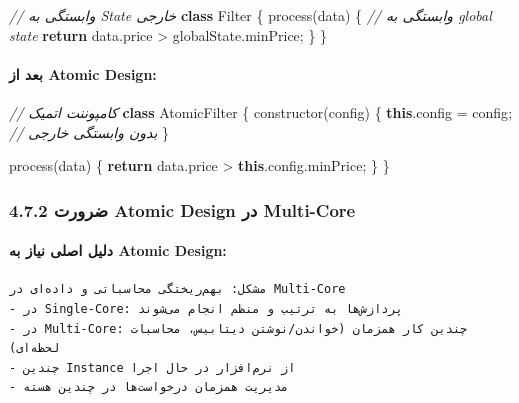 \documentclass[
]{article}
\newenvironment{Shaded}{}{}
\newcommand{\AttributeTok}[1]{\textcolor[rgb]{0.49,0.56,0.16}{#1}}
\newcommand{\BuiltInTok}[1]{\textcolor[rgb]{0.00,0.50,0.00}{#1}}
\newcommand{\CommentTok}[1]{\textcolor[rgb]{0.38,0.63,0.69}{\textit{#1}}}
\newcommand{\ControlFlowTok}[1]{\textcolor[rgb]{0.00,0.44,0.13}{\textbf{#1}}}
\newcommand{\FunctionTok}[1]{\textcolor[rgb]{0.02,0.16,0.49}{#1}}
\newcommand{\KeywordTok}[1]{\textcolor[rgb]{0.00,0.44,0.13}{\textbf{#1}}}
\newcommand{\NormalTok}[1]{#1}
\newcommand{\OperatorTok}[1]{\textcolor[rgb]{0.40,0.40,0.40}{#1}}
\begin{document}
\begin{Shaded}
\begin{Highlighting}[]
\CommentTok{// وابستگی به State خارجی}
\KeywordTok{class}\NormalTok{ Filter \{}
  \BuiltInTok{process}\NormalTok{(data) \{}
    \CommentTok{// وابستگی به global state}
    \ControlFlowTok{return}\NormalTok{ data}\OperatorTok{.}\AttributeTok{price} \OperatorTok{\textgreater{}}\NormalTok{ globalState}\OperatorTok{.}\AttributeTok{minPrice}\OperatorTok{;}
\NormalTok{  \}}
\NormalTok{\}}
\end{Highlighting}
\end{Shaded}

\paragraph{بعد از Atomic
Design:}\label{ux628ux639ux62f-ux627ux632-atomic-design}

\begin{Shaded}
\begin{Highlighting}[]
\CommentTok{// کامپوننت اتمیک}
\KeywordTok{class}\NormalTok{ AtomicFilter \{}
  \FunctionTok{constructor}\NormalTok{(config) \{}
    \KeywordTok{this}\OperatorTok{.}\AttributeTok{config} \OperatorTok{=}\NormalTok{ config}\OperatorTok{;} \CommentTok{// بدون وابستگی خارجی}
\NormalTok{  \}}

  \BuiltInTok{process}\NormalTok{(data) \{}
    \ControlFlowTok{return}\NormalTok{ data}\OperatorTok{.}\AttributeTok{price} \OperatorTok{\textgreater{}} \KeywordTok{this}\OperatorTok{.}\AttributeTok{config}\OperatorTok{.}\AttributeTok{minPrice}\OperatorTok{;}
\NormalTok{  \}}
\NormalTok{\}}
\end{Highlighting}
\end{Shaded}

\subsubsection{4.7.2 ضرورت Atomic Design در
Multi-Core}\label{ux636ux631ux648ux631ux62a-atomic-design-ux62fux631-multi-core}

\paragraph{دلیل اصلی نیاز به Atomic
Design:}\label{ux62fux644ux6ccux644-ux627ux635ux644ux6cc-ux646ux6ccux627ux632-ux628ux647-atomic-design}

\begin{verbatim}
مشکل: بهم‌ریختگی محاسباتی و داده‌ای در Multi-Core
- در Single-Core: پردازش‌ها به ترتیب و منظم انجام می‌شوند
- در Multi-Core: چندین کار همزمان (خواندن/نوشتن دیتابیس، محاسبات لحظه‌ای)
- چندین Instance از نرم‌افزار در حال اجرا
- مدیریت همزمان درخواست‌ها در چندین هسته
\end{verbatim}
\end{document}
